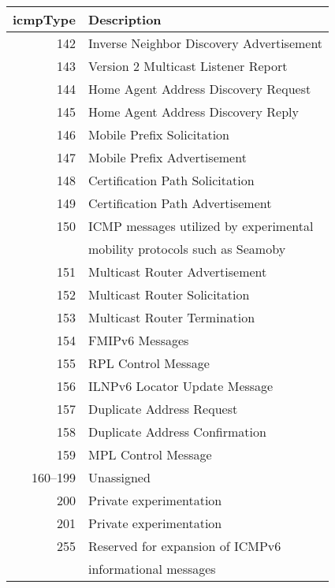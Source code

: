 \documentclass[documentation]{subfiles}
\begin{document}
\begin{small}
    \hfill
    \begin{minipage}{0.45\textwidth}
        \begin{longtable} {rl}
            \toprule
            {\bf icmpType} & {\bf Description}\\
            \midrule\endhead%
            142 & Inverse Neighbor Discovery Advertisement \\
            143 & Version 2 Multicast Listener Report\\
            144 & Home Agent Address Discovery Request \\
            145 & Home Agent Address Discovery Reply \\
            146 & Mobile Prefix Solicitation\\
            147 & Mobile Prefix Advertisement\\
            148 & Certification Path Solicitation \\
            149 & Certification Path Advertisement \\
            150 & ICMP messages utilized by experimental \\
                & mobility protocols such as Seamoby\\
            151 & Multicast Router Advertisement\\
            152 & Multicast Router Solicitation\\
            153 & Multicast Router Termination\\
            154 & FMIPv6 Messages\\
            155 & RPL Control Message\\
            156 & ILNPv6 Locator Update Message\\
            157 & Duplicate Address Request\\
            158 & Duplicate Address Confirmation\\
            159 & MPL Control Message\\
            160--199 & Unassigned\\
            200 & Private experimentation\\
            201 & Private experimentation\\
            255 & Reserved for expansion of ICMPv6\\
                & informational messages\\
            \bottomrule
        \end{longtable}
    \end{minipage}
\end{small}
\end{document}
